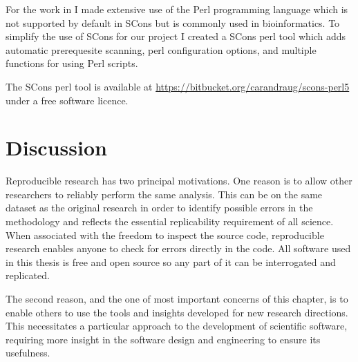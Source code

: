 
For the work in  I made extensive use of
the Perl programming language which is not supported by default in
SCons but is commonly used in bioinformatics.
To simplify the use of SCons for our project I created
a SCons perl tool which adds automatic prerequesite
scanning, perl configuration options, and multiple functions for using
Perl scripts.

The SCons perl tool is available at
\url{https://bitbucket.org/carandraug/scons-perl5} under a free
software licence.


\section{Discussion}

Reproducible research has two principal motivations.
One reason is to allow other
researchers to reliably perform the same analysis.  This can be on the same
dataset as the original research in order to identify possible errors in the
methodology and reflects the essential replicability requirement of all science.
When associated with the freedom to inspect the
source code, reproducible research enables anyone
to check for errors directly in the
code.  All software used in this thesis is free and open source so any
part of it can be interrogated and replicated.

The second reason, and the one of most important concerns of this chapter, is to
enable others to use the tools and insights
developed for new research directions.  This
necessitates a particular approach to the development of scientific
software, requiring more insight in the software design and
engineering to ensure its usefulness.

